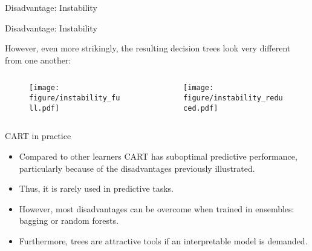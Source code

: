\documentclass[11pt,compress,t,notes=noshow, xcolor=table]{beamer}
\begin{document}
\begin{vbframe}{Disadvantage: Instability}


\end{vbframe}

\begin{vbframe}{Disadvantage: Instability}

However, even more strikingly, the resulting decision trees look very different from one another:

\begin{columns}
\begin{column}{0.5\textwidth}
\begin{figure}
\texttt{[image: figure/instability\_full.pdf]} 
\end{figure}
\end{column}
\begin{column}{0.5\textwidth}
\begin{figure}
\texttt{[image: figure/instability\_reduced.pdf]} 
\end{figure}
\end{column}
\end{columns}

\end{vbframe}

\begin{vbframe}{CART in practice}

\begin{itemize}
\item Compared to other learners CART has suboptimal predictive performance, particularly because of the disadvantages previously illustrated.
\item Thus, it is rarely used in predictive tasks.
\item However, most disadvantages can be overcome when trained in ensembles: bagging or random forests.
\item Furthermore, trees are attractive tools if an interpretable model is demanded.
\end{itemize}



\end{vbframe}
\end{document}
